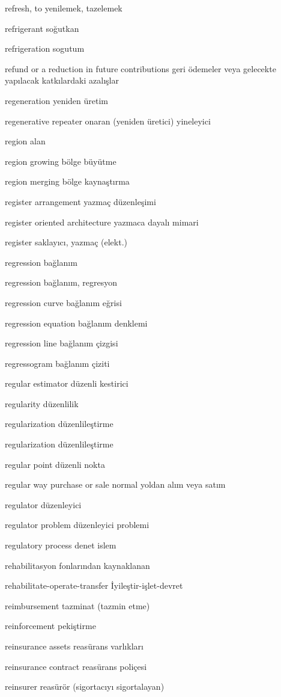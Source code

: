 \documentclass[12pt,fleqn]{article}\usepackage{../../common}
\begin{document}
refresh, to yenilemek, tazelemek

refrigerant soğutkan

refrigeration sogutum

refund or a reduction in future contributions geri ödemeler veya gelecekte yapılacak katkılardaki azalışlar

regeneration yeniden üretim

regenerative repeater onaran (yeniden üretici) yineleyici

region alan

region growing bölge büyütme

region merging bölge kaynaştırma

register arrangement yazmaç düzenleşimi

register oriented architecture yazmaca dayalı mimari

register saklayıcı, yazmaç (elekt.)

regression bağlanım

regression bağlanım, regresyon

regression curve bağlanım eğrisi

regression equation bağlanım denklemi

regression line bağlanım çizgisi

regressogram bağlanım çiziti

regular estimator düzenli kestirici

regularity düzenlilik

regularization düzenlileştirme

regularization düzenlileştirme

regular point düzenli nokta

regular way purchase or sale normal yoldan alım veya satım

regulator düzenleyici

regulator problem düzenleyici problemi

regulatory process denet islem

rehabilitasyon fonlarından kaynaklanan

rehabilitate-operate-transfer İyileştir-işlet-devret

reimbursement tazminat (tazmin etme)

reinforcement pekiştirme

reinsurance assets reasürans varlıkları

reinsurance contract reasürans poliçesi

reinsurer reasürör (sigortacıyı sigortalayan)
\end{document}

